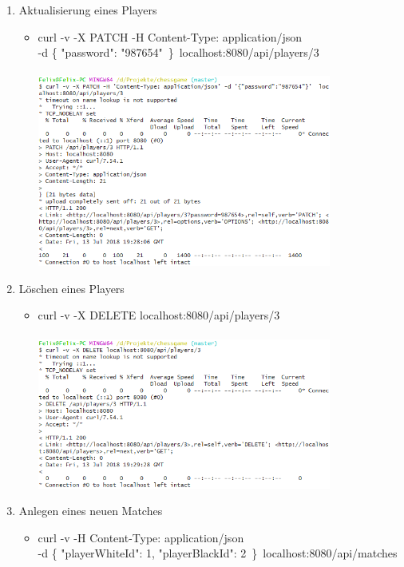 \begin{enumerate}
\begin{itemize}
		\end{itemize}
	\item Aktualisierung eines Players
		\begin{itemize}
			\item curl -v -X PATCH -H \textquotesingle Content-Type: application/json\textquotesingle\\-d \textquotesingle\{ "password": "987654"\ \}\textquotesingle\ localhost:8080/api/players/3\\
				\\
				\includegraphics[width=0.8\textwidth]{images/question5.png}
		\end{itemize}
	\newpage
	\item Löschen eines Players
		\begin{itemize}
			\item curl -v -X DELETE localhost:8080/api/players/3\\
				\\
				\includegraphics[width=0.8\textwidth]{images/question6.png}
		\end{itemize}
	\newpage
	\item Anlegen eines neuen Matches
		\begin{itemize}
			\item curl -v -H \textquotesingle Content-Type: application/json\textquotesingle\\-d \textquotesingle\{ "playerWhiteId": 1, "playerBlackId": 2\ \}\textquotesingle\ localhost:8080/api/matches\\

\end{itemize}
\end{enumerate}
